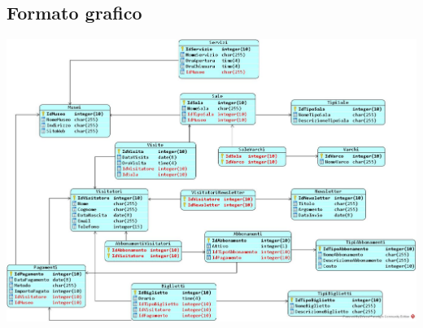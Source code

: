 \documentclass[a4paper, 12pt]{article}
\begin{document}
\subsection{Formato grafico}
\includegraphics[width=17cm]{relazionale.jpg}
\end{document}
